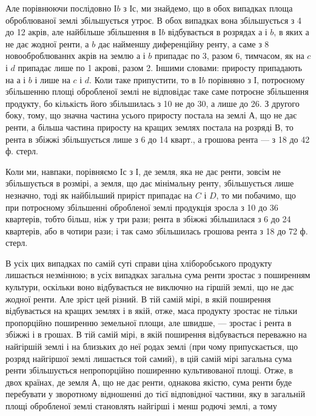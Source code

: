 Але порівнюючи послідовно І$b$ з І$с$, ми знайдемо, що в обох випадках площа
оброблюваної землі збільшується утроє. В обох випадках вона збільшується з
4 до 12 акрів, але найбільше збільшення в I$b$ відбувається в розрядах
$а$ і $b$, в яких $а$ не дає жодної ренти, а $b$ дає найменшу
диференційну ренту, а саме з 8 новооброблюваннх акрів на землю $а$ і $b$
припадає по 3, разом 6, тимчасом,
як на $c$ і $d$ припадає лише по 1 акрові, разом 2. Іншими словами:  приросту
припадають на $а$ і $b$ і лише  на $c$ і $d$. Коли таке припустити, то в
I$b$ порівняно з І, потроєному збільшенню площі обробленої землі не відповідає
таке саме потроєне збільшення продукту, бо кількість його збільшилась з 10
не до 30, а лише до 26. З другого боку, тому, що значна частина усього приросту
постала на землі $А$, що не дає ренти, а більша частина приросту на
кращих землях постала на розряді $В$, то рента в збіжжі збільшується лише
з 6 до 14 кварт., а грошова рента — з 18 до 42 ф. стерл.

Коли ми, навпаки, порівняємо І$с$ з І, де земля, яка не дає ренти, зовсім
не збільшується в розмірі, а земля, що дає мінімальну ренту, збільшується
лише незначно, тоді як найбільший приріст припадає на $C$ і $D$, то ми побачимо,
що при потроєному збільшенні обробленої землі продукція зросла з 10 до
36 квартерів, тобто більш, ніж у три рази; рента в збіжжі збільшилася з 6 до
24 квартерів, або в чотири рази; і так само збільшилась грошова рента
з 18 до 72 ф. стерл.

В усіх цих випадках по самій суті справи ціна хліборобського продукту
лишається незмінною; в усіх випадках загальна сума ренти зростає з поширенням
культури, оскільки воно відбувається не виключно на гіршій землі, що
не дає жодної ренти. Але зріст цей різний. В тій самій мірі, в якій поширення
відбувається на кращих землях і в якій, отже, маса продукту зростає не тільки
пропорційно поширенню земельної площи, але швидше, — зростає і рента в
збіжжі і в грошах. В тій самій мірі, в якій поширення відбувається переважно
на найгіршій землі і на близьких до неї родах землі (при чому припускається,
що розряд найгіршої землі лишається той самий), в цій самій мірі загальна
сума ренти збільшується непропорційно поширенню культивованої площі. Отже,
в двох країнах, де земля $А$, що не дає ренти, однакова якістю, сума ренти
буде перебувати у зворотному відношенні до тієї відповідної частини, яку в загальній
площі обробленої землі становлять найгірші і менш родючі землі, а тому

\parbreak{}  %
